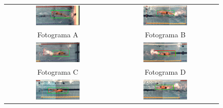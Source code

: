 \begin{figure}[h!]
    \centering
    \begin{tabular}{cc}
          \includegraphics[width=0.43\textwidth,height=0.43\textheight,keepaspectratio]{imagenes/parte_BS/iou_visual/mala_1099.png} &
          \includegraphics[width=0.43\textwidth,height=0.43\textheight,keepaspectratio]{imagenes/parte_BS/iou_visual/medio_cuerpo_1259.png}
          \\ Fotograma A   & Fotograma B \\
          \includegraphics[width=0.43\textwidth,height=0.43\textheight,keepaspectratio]{imagenes/parte_BS/iou_visual/muchisima_agua_1014.png} &
          \includegraphics[width=0.43\textwidth,height=0.43\textheight,keepaspectratio]{imagenes/parte_BS/iou_visual/mucha_agua_897.png}
          \\ Fotograma C & Fotograma D \\
          \includegraphics[width=0.43\textwidth,height=0.43\textheight,keepaspectratio]{imagenes/parte_BS/iou_visual/excelente_611.png} &
          \includegraphics[width=0.43\textwidth,height=0.43\textheight,keepaspectratio]{imagenes/parte_BS/iou_visual/excelentisimo_1241.png}

\end{tabular}
\end{figure}
